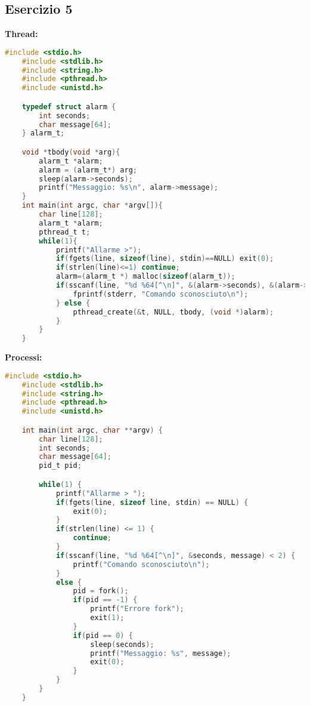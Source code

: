 \documentclass[12pt]{article}
\begin{document}
\subsection*{Esercizio 5}
\textbf{Thread:}
\begin{lstlisting}[language=c]
    #include <stdio.h>
    #include <stdlib.h>
    #include <string.h>
    #include <pthread.h>
    #include <unistd.h>

    typedef struct alarm {
        int seconds;
        char message[64];
    } alarm_t;

    void *tbody(void *arg){
        alarm_t *alarm;
        alarm = (alarm_t*) arg;
        sleep(alarm->seconds);
        printf("Messaggio: %s\n", alarm->message);
    }
    int main(int argc, char *argv[]){
        char line[128];
        alarm_t *alarm;
        pthread_t t;
        while(1){
            printf("Allarme >");
            if(fgets(line, sizeof(line), stdin)==NULL) exit(0);
            if(strlen(line)<=1) continue;
            alarm=(alarm_t *) malloc(sizeof(alarm_t));
            if(sscanf(line, "%d %64[^\n]", &(alarm->seconds), &(alarm->message))<2) {
                fprintf(stderr, "Comando sconosciuto\n");
            } else {
                pthread_create(&t, NULL, tbody, (void *)alarm);
            }
        }
    }
\end{lstlisting}
\textbf{Processi:}
\begin{lstlisting}[language=c]
    #include <stdio.h>
    #include <stdlib.h>
    #include <string.h>
    #include <pthread.h>
    #include <unistd.h>

    int main(int argc, char **argv) {
        char line[128];
        int seconds;
        char message[64];
        pid_t pid;

        while(1) {
            printf("Allarme > ");
            if(fgets(line, sizeof line, stdin) == NULL) {
                exit(0);
            }
            if(strlen(line) <= 1) {
                continue;
            }
            if(sscanf(line, "%d %64[^\n]", &seconds, message) < 2) {
                printf("Comando sconosciuto\n");
            }
            else {
                pid = fork();
                if(pid == -1) {
                    printf("Errore fork");
                    exit(1);
                }
                if(pid == 0) {
                    sleep(seconds);
                    printf("Messaggio: %s", message);
                    exit(0);
                }
            }
        }
    }
\end{lstlisting}
\end{document}
